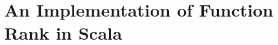 \chapter{An Implementation of Function Rank in Scala}
\label{apjverb}

\begin{singlespacing} 
\begin{small}
\end{small}
\end{singlespacing}

